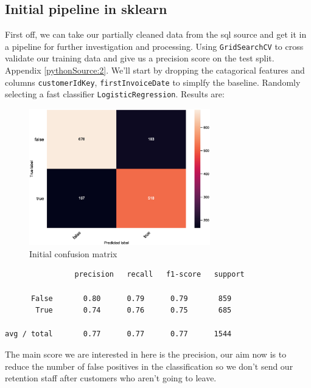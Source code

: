\documentclass[runningheads]{llncs}
\begin{document}
\subsection{Initial pipeline in sklearn}
First off, we can take our partially cleaned data from the sql source and get it in a pipeline for further investigation and processing. Using \texttt{GridSearchCV} to cross validate our training data and give us a precision score on the test split. Appendix \ref{pythonSource:2}. We'll start by dropping the catagorical features and columns \texttt{customerIdKey}, \texttt{firstInvoiceDate} to simplfy the baseline. Randomly selecting a fast classifier \texttt{LogisticRegression}. Results are:
\begin{figure}[ht!]
\centering
\includegraphics[width=0.7\textwidth]{initialScore.eps}
\caption{\label{fig:overleaf}Initial confusion matrix}
\end{figure}
\begin{verbatim}
                precision   recall   f1-score   support

      False       0.80      0.79      0.79       859
       True       0.74      0.76      0.75       685

avg / total       0.77      0.77      0.77      1544
\end{verbatim}
The main score we are interested in here is the precision, our aim now is to reduce the number of false positives in the classification so we don't send our retention staff after customers who aren't going to leave.
\end{document}

